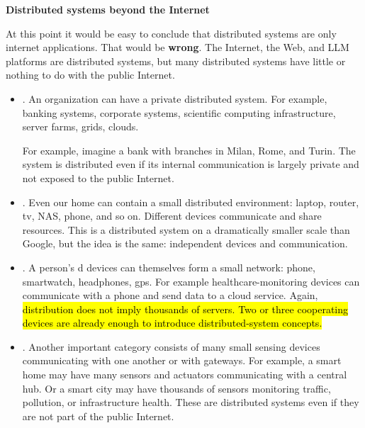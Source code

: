 \highspace
\begin{flushleft}
    \textcolor{Green3}{ \textbf{Distributed systems beyond the Internet}}
\end{flushleft}
At this point it would be easy to conclude that distributed systems are only internet applications. That would be \textbf{wrong}. The Internet, the Web, and LLM platforms are distributed systems, but many distributed systems have little or nothing to do with the public Internet.

\begin{examplebox}
    \begin{itemize}
        \item {}. An organization can have a private distributed system. For example, banking systems, corporate systems, scientific computing infrastructure, server farms, grids, clouds.

            For example, imagine a bank with branches in Milan, Rome, and Turin. The system is distributed even if its internal communication is largely private and not exposed to the public Internet.

        \item {}. Even our home can contain a small distributed environment: laptop, router, tv, NAS, phone, and so on. Different devices communicate and share resources. This is a distributed system on a dramatically smaller scale than Google, but the idea is the same: independent devices and communication.

        \item {}. A person's d devices can themselves form a small network: phone, smartwatch, headphones, gps. For example healthcare-monitoring devices can communicate with a phone and send data to a cloud service. Again, \hl{distribution does not imply thousands of servers. Two or three cooperating devices are already enough to introduce distributed-system concepts.}

        \item {}. Another important category consists of many small sensing devices communicating with one another or with gateways.
            For example, a smart home may have many sensors and actuators communicating with a central hub. Or a smart city may have thousands of sensors monitoring traffic, pollution, or infrastructure health. These are distributed systems even if they are not part of the public Internet.
    \end{itemize}
\end{examplebox}

